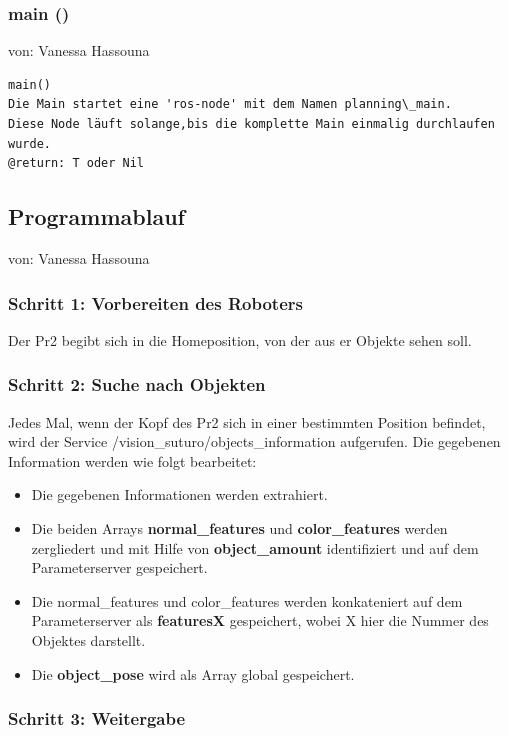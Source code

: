 \documentclass{suturo}
\makeatletter
\newcommand{\chapterauthor}[1]{%
  {\parindent0pt\vspace*{-27pt}%
  \linespread{0}\small\begin{flushright}von: #1\end{flushright}%
  \par\nobreak\vspace*{0pt}}
  \@afterheading%
}
\makeatother
\begin{document}
\subsubsection{main ()}
\chapterauthor{Vanessa Hassouna}
\begin{verbatim}
main()
Die Main startet eine 'ros-node' mit dem Namen planning\_main.
Diese Node läuft solange,bis die komplette Main einmalig durchlaufen wurde. 
@return: T oder Nil 
\end{verbatim}



\subsection{Programmablauf}
\chapterauthor{Vanessa Hassouna}
\subsubsection{Schritt 1: Vorbereiten des Roboters}
Der Pr2 begibt sich in die Homeposition, von der aus er Objekte sehen soll. 

\subsubsection{Schritt 2: Suche nach Objekten}
Jedes Mal, wenn der Kopf des Pr2 sich in einer bestimmten Position befindet, wird der Service /vision\_suturo/objects\_information aufgerufen. Die gegebenen Information werden wie folgt bearbeitet:

\begin{itemize}
\item Die gegebenen Informationen werden extrahiert.
\item Die beiden Arrays \textbf{normal\_features} und \textbf{color\_features} werden zergliedert und mit Hilfe von \textbf{object\_amount} identifiziert und auf dem Parameterserver gespeichert.
\item Die normal\_features und color\_features werden konkateniert auf dem Parameterserver als \textbf{featuresX} gespeichert, wobei X hier die Nummer des Objektes darstellt.
\item Die \textbf{object\_pose} wird als Array global gespeichert.
\end{itemize}



\subsubsection{Schritt 3: Weitergabe} 
\end{document}
